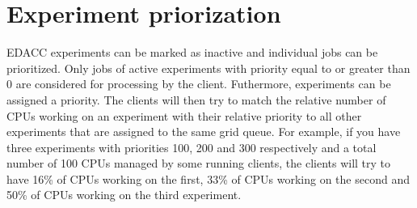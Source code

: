 \documentclass{article}
\begin{document}
\section{Experiment priorization}
EDACC experiments can be marked as inactive and individual jobs can be prioritized. Only jobs of active experiments with priority equal to or greater than 0 are considered for processing
by the client. Futhermore, experiments can be assigned a priority. The clients will then try to match the relative number of CPUs working on an experiment with their relative priority to
all other experiments that are assigned to the same grid queue. For example, if you have three experiments with priorities 100, 200 and 300 respectively and a total number of 100 CPUs managed
by some running clients, the clients will try to have 16\% of CPUs working on the first, 33\% of CPUs working on the second and 50\% of CPUs working on the third experiment.
\end{document}
